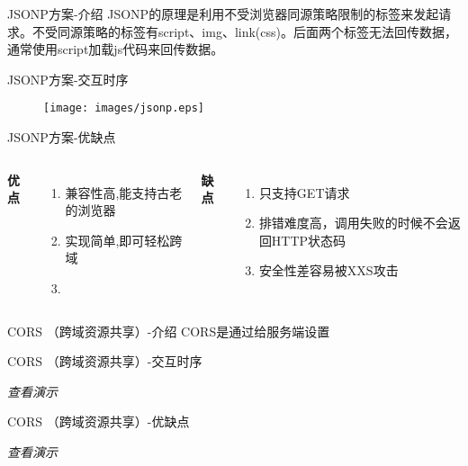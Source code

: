 \documentclass[aspectratio=169,xcolor=dvipsnames,UTF8]{beamer}
\begin{document}
\begin{frame}{JSONP方案-介绍}
JSONP的原理是利用不受浏览器同源策略限制的标签来发起请求。不受同源策略的标签有script、img、link(css)。后面两个标签无法回传数据，通常使用script加载js代码来回传数据。
\end{frame}

\begin{frame}{JSONP方案-交互时序}
    \begin{figure}
	\texttt{[image: images/jsonp.eps]}
        \caption{}
    \end{figure}
\end{frame}

\begin{frame}{JSONP方案-优缺点}
\begin{columns}[c]
        \textbf{优点}
            \begin{enumerate}
                \item 兼容性高,能支持古老的浏览器
                \item 实现简单,即可轻松跨域
                \item 
            \end{enumerate}
        \textbf{缺点}
            \begin{enumerate}
                \item 只支持GET请求
                \item 排错难度高，调用失败的时候不会返回HTTP状态码
                \item 安全性差容易被XXS攻击
            \end{enumerate}
\end{columns}
\end{frame}


\begin{frame}{CORS （跨域资源共享）-介绍}
CORS是通过给服务端设置
\end{frame}

\begin{frame}{CORS （跨域资源共享）-交互时序}
    \begin{block}{}
			\emph{查看演示}
	\end{block}  
\end{frame}

\begin{frame}{CORS （跨域资源共享）-优缺点}
    \begin{block}{}
			\emph{查看演示}
	\end{block} 
\end{frame}
\end{document}
